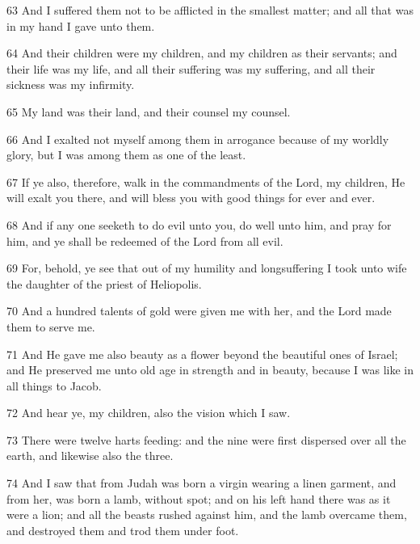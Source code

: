 \par 63 And I suffered them not to be afflicted in the smallest matter; and all that was in my hand I gave unto them.

\par 64 And their children were my children, and my children as their servants; and their life was my life, and all their suffering was my suffering, and all their sickness was my infirmity.

\par 65 My land was their land, and their counsel my counsel.

\par 66 And I exalted not myself among them in arrogance because of my worldly glory, but I was among them as one of the least.

\par 67 If ye also, therefore, walk in the commandments of the Lord, my children, He will exalt you there, and will bless you with good things for ever and ever.

\par 68 And if any one seeketh to do evil unto you, do well unto him, and pray for him, and ye shall be redeemed of the Lord from all evil.

\par 69 For, behold, ye see that out of my humility and longsuffering I took unto wife the daughter of the priest of Heliopolis.

\par 70 And a hundred talents of gold were given me with her, and the Lord made them to serve me.

\par 71 And He gave me also beauty as a flower beyond the beautiful ones of Israel; and He preserved me unto old age in strength and in beauty, because I was like in all things to Jacob.

\par 72 And hear ye, my children, also the vision which I saw.

\par 73 There were twelve harts feeding: and the nine were first dispersed over all the earth, and likewise also the three.

\par 74 And I saw that from Judah was born a virgin wearing a linen garment, and from her, was born a lamb, without spot; and on his left hand there was as it were a lion; and all the beasts rushed against him, and the lamb overcame them, and destroyed them and trod them under foot.

